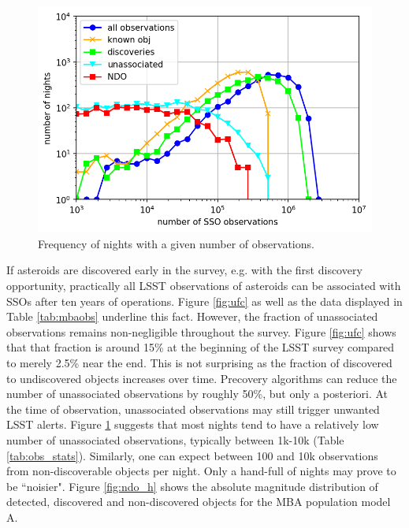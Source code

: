 %
\begin{figure}[tb!]
\begin{center}
\includegraphics[width=0.7\linewidth]{figs/nights_vs_obs.png} 
\end{center}
\caption{Frequency of nights with a given number of observations.\label{fig:obs_stats}}
\end{figure}
If asteroids are discovered early in the survey, e.g. with the first discovery opportunity, practically all \gls{LSST} observations of asteroids can be associated with SSOs after ten years of operations. Figure \ref{fig:ufc} as well as the data displayed in Table \ref{tab:mbaobs} underline this fact. 
However, the fraction of unassociated observations remains non-negligible throughout the survey.  
Figure \ref{fig:ufc} shows that that fraction is around 15\% at the beginning of the \gls{LSST} survey compared to merely 2.5\% near the end. This is not surprising as the fraction of discovered to undiscovered objects increases over time.
Precovery algorithms can reduce the number of unassociated observations by roughly 50\%, but only a posteriori. 
At the time of observation, unassociated observations may still trigger unwanted \gls{LSST} alerts. 
Figure \ref{fig:obs_stats} suggests that most nights tend to have a relatively low number of unassociated observations, typically between 1k-10k (Table \ref{tab:obs_stats}). Similarly, one can expect between 100 and 10k observations from non-discoverable objects per night. Only a hand-full of nights may prove to be ``noisier".
Figure \ref{fig:ndo_h} shows the absolute magnitude distribution of detected, discovered and non-discovered objects for the \gls{MBA} population model A.
